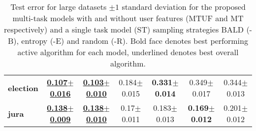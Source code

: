 \begin{table*}[t]
{\begin{tabular}{l|ccc|ccc}
\textbf{election}&\underline{\bf{0.107$\pm$0.016}} &\underline{\bf{0.103$\pm$0.010}} &0.184$\pm$0.015 &\bf{0.331$\pm$0.014} &0.349$\pm$0.017 &0.344$\pm$0.013 \\

\textbf{jura}&\underline{\bf{0.138$\pm$0.009}} &\underline{\bf{0.138$\pm$0.010}} &0.17$\pm$0.011 &0.183$\pm$0.013 &\bf{0.169$\pm$0.012} &0.201$\pm$0.012 \\


\end{tabular}

}
\caption{Test error for large datasets $\pm 1$ standard deviation for the proposed multi-task models with and without user features (MTUF and MT respectively) and a single task model (ST) \cite{chu2005} sampling strategies BALD (-B), entropy (-E) and random (-R).  Bold face denotes best performing active algorithm for each model, underlined denotes best overall algorithm.}
\label{tab:large}
\end{table*}

